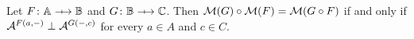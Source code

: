 \begin{theorem}
    Let \( F \colon \Grp \profarrow \Grpb \) and \( G \colon \Grpb \profarrow \Grpc \).
    Then \( \mathcal{M}({G}) \circ \mathcal{M}({F}) = \mathcal{M}({G \circ F}) \) if and only if \( \mathcal{A}^{F(a, {-})} \mathrel{\bot} \mathcal{A}^{G({-}, c)} \) for every \( a \in A \) and \( c \in C \).
\end{theorem}





